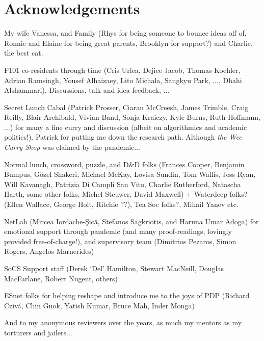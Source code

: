 \chapter*{Acknowledgements}

My wife Vanessa, and Family (Rhys for being someone to bounce ideas off of, Ronnie and Elaine for being great parents, Brooklyn for support?) and Charlie, the best cat.

F101 co-residents through time (Cris Urlea, Dejice Jacob, Thomas Koehler, Adrian Ramsingh, Yousef Alhaizaey, Lito Michala, Sangkyu Park, ..., Dhahi Alshammari). Discussions, talk and idea feedback, ...

Secret Lunch Cabal (Patrick Prosser, Ciaran McCreesh, James Trimble, Craig Reilly, Blair Archibald, Vivian Band, Sonja Kraiczy, Kyle Burns, Ruth Hoffmann, ...) for many a fine curry and discussion (albeit on algorithmics and academic politics!). Patrick for putting me down the research path. Although \emph{the Wee Curry Shop} was claimed by the pandemic...

Normal lunch, crossword, puzzle, and D\&D folks (Frances Cooper, Benjamin Bumpus, G\"{o}zel Shakeri, Michael McKay, Lovisa Sundin, Tom Wallis, Jess Ryan, Will Kavanagh, Patrizia Di Campli San Vito, Charlie Rutherford, Natascha Harth, some other folks, Michel Steuwer, David Maxwell) + Waterdeep folks? (Ellen Wallace, George Holt, Ritchie ??), Tea Soc folks?, Mihail Yanev etc.

NetLab (Mircea Iordache-\c{S}ic\u{a}, Stefanos Sagkriotis, and Haruna Umar Adoga) for emotional support through pandemic (and many proof-readings, lovingly provided free-of-charge!), and supervisory team (Dimitrios Pezaros, Simon Rogers, Angelos Marnerides)

SoCS Support staff (Derek `Del' Hamilton, Stewart MacNeill, Douglas MacFarlane, Robert Nugent, others)

ESnet folks for helping reshape and introduce me to the joys of PDP (Richard Cziv\'{a}, Chin Guok, Yatish Kumar, Bruce Mah, Inder Monga)

And to my anonymous reviewers over the years, as much my mentors as my torturers and jailers...